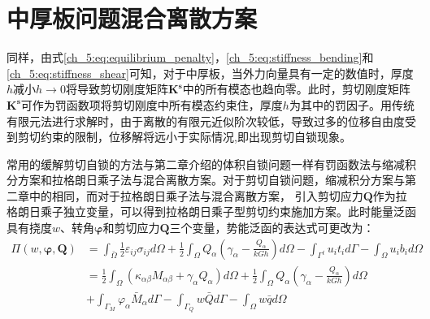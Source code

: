 \section{中厚板问题混合离散方案} 
同样，由式\eqref{ch_5:eq:equilibrium_penalty}，\eqref{ch_5:eq:stiffness_bending}和\eqref{ch_5:eq:stiffness_shear}可知，对于中厚板，当外力向量具有一定的数值时，厚度$h$减小$h\rightarrow 0$将导致剪切刚度矩阵$\boldsymbol{K^s}$中的所有模态也趋向零。此时，剪切刚度矩阵$\boldsymbol{K^s}$可作为罚函数项将剪切刚度中所有模态约束住，厚度$h$为其中的罚因子。用传统有限元法进行求解时，由于离散的有限元近似阶次较低，导致过多的位移自由度受到剪切约束的限制，位移解将远小于实际情况,即出现剪切自锁现象。  

常用的缓解剪切自锁的方法与第二章介绍的体积自锁问题一样有罚函数法与缩减积分方案和拉格朗日乘子法与混合离散方案。对于剪切自锁问题，缩减积分方案与第二章中的相同，而对于拉格朗日乘子法与混合离散方案， 引入剪切应力$\boldsymbol{Q}$作为拉格朗日乘子独立变量，可以得到拉格朗日乘子型剪切约束施加方案。此时能量泛函具有挠度$w$、转角$\boldsymbol{\varphi}$和剪切应力$\boldsymbol{Q}$三个变量，势能泛函的表达式可更改为：
\begin{equation}\label{ch_5:eq:potential_energy_mixed}
    \begin{split} 
        \Pi(w,\boldsymbol{\varphi},\boldsymbol{Q})&=\int_{\bar\Omega}\frac{1}{2}\varepsilon_{ij}\sigma_{ij} d\Omega+\frac{1}{2}\int_{\Omega}Q_{\alpha}(\gamma_{\alpha}-\frac{Q_{\alpha}}{kGh})d\Omega-\int_{\Gamma^{t}} u_{i}t_{i}d\Gamma-\int_{\Omega} u_{i}b_{i}d\Omega\\
        &=\frac{1}{2}\int_{\Omega}(\kappa_{\alpha \beta}M_{\alpha \beta}+\gamma_{\alpha}Q_{\alpha})d\Omega+\frac{1}{2}\int_{\Omega}Q_{\alpha}(\gamma_{\alpha}-\frac{Q_{\alpha}}{kGh})d\Omega\\
        &+\int_{\Gamma_{M}}\varphi_{\alpha}{\bar{M}_{\alpha}}d\Gamma-\int_{\Gamma_{Q}}{w}\bar {Q}d\Gamma-\int_{\Omega} w\bar{q}d\Omega
    \end{split}
\end{equation}

